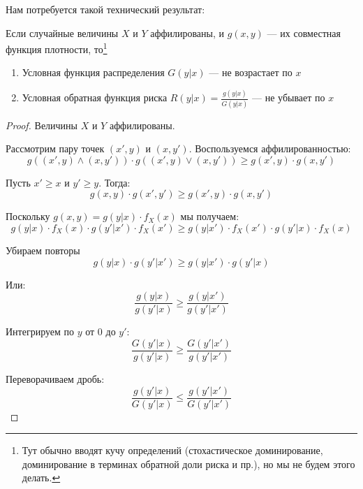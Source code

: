 Нам потребуется такой технический результат:
\begin{myth}
Если случайные величины $ X $ и $ Y $ аффилированы, и $ g(x,y) $ --- их совместная функция плотности, то\footnote{Тут обычно вводят кучу определений (стохастическое доминирование, доминирование в терминах обратной доли риска и пр.), но мы не будем этого делать.}  
\begin{enumerate}
\item Условная функция распределения $ G(y|x)$ --- не возрастает по $ x $
\item Условная обратная функция риска  $ R(y|x)=\frac{g(y|x)}{G(y|x)} $ --- не убывает по $ x $
\end{enumerate}
\end{myth}
\begin{proof}
Величины $ X $ и $ Y $ аффилированы.

Рассмотрим пару точек $ (x',y) $ и $ (x,y') $. Воспользуемся аффилированностью:
\begin{equation}
g((x',y)\wedge (x,y'))\cdot g((x',y)\vee (x,y'))\geq g(x',y)\cdot g(x,y')
\end{equation}


Пусть $ x'\geq x $ и $ y'\geq y $. Тогда:
\begin{equation}
g(x,y)\cdot g(x',y')\geq g(x',y)\cdot g(x,y')
\end{equation}

Поскольку $ g(x,y)=g(y|x)\cdot f_{X}(x) $ мы получаем:
\begin{equation}
g(y|x)\cdot f_{X}(x)\cdot g(y'|x')\cdot f_{X}(x')\geq g(y|x')\cdot f_{X}(x')\cdot g(y'|x)\cdot f_{X}(x)
\end{equation}

Убираем повторы
\begin{equation}
g(y|x)\cdot g(y'|x')\geq g(y|x')\cdot g(y'|x)
\end{equation}

Или:
\begin{equation}
\frac{g(y|x)}{g(y'|x)}\geq \frac{g(y|x')}{g(y'|x')}
\end{equation}

Интегрируем по $ y $ от $ 0 $ до $ y' $:
\begin{equation}
\frac{G(y'|x)}{g(y'|x)}\geq \frac{G(y'|x')}{g(y'|x')}
\end{equation}

Переворачиваем дробь:
\begin{equation}
\frac{g(y'|x)}{G(y'|x)}\leq \frac{g(y'|x')}{G(y'|x')}
\end{equation}


\end{proof}
